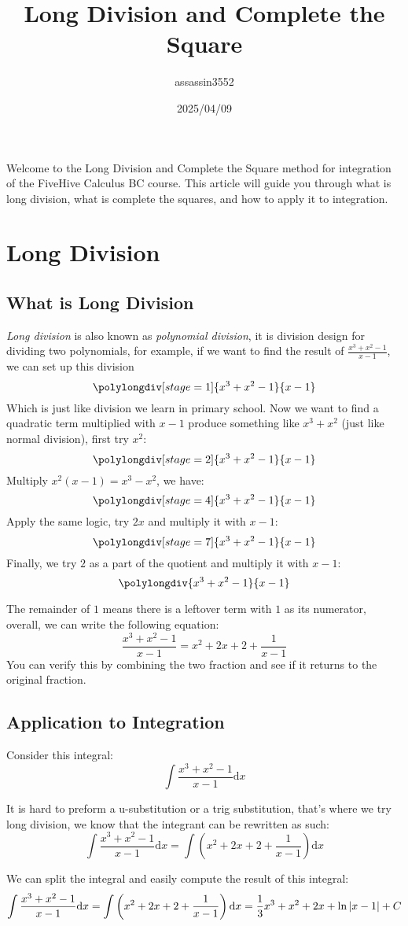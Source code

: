 \documentclass{article}
\title{Long Division and Complete the Square}
\author{assassin3552}
\date{2025/04/09}
\numberwithin{equation}{section}
\begin{document}
\maketitle
Welcome to the Long Division and Complete the Square method for integration of the FiveHive Calculus BC course. This article will guide you through what is long division, what is complete the squares, and how to apply it to integration.
\section{Long Division}
\subsection{What is Long Division}
\emph{Long division} is also known as \emph{polynomial division}, it is division design for dividing two polynomials, for example, 
if we want to find the result of $\displaystyle \frac{x^3+x^2-1}{x-1}$, 
we can set up this division
\[
    \polylongdiv[stage=1]{x^3+x^2-1}{x-1}
\]
Which is just like division we learn in primary school. Now we want to find a quadratic term multiplied with $x-1$ produce something
like $x^3 + x^2$ (just like normal division), first try $x^2$:
\[
    \polylongdiv[stage=2]{x^3+x^2-1}{x-1}
\]
Multiply $x^2(x-1) = x^3 -x^2$, we have:
\[
    \polylongdiv[stage=4]{x^3+x^2-1}{x-1}
\]
Apply the same logic, try $2x$ and multiply it with $x-1$:
\[
    \polylongdiv[stage=7]{x^3+x^2-1}{x-1}
\]
Finally, we try $2$ as a part of the quotient and multiply it with $x-1$:
\[
    \polylongdiv{x^3+x^2-1}{x-1}
\]

The remainder of $1$ means there is a leftover term with $1$ as its numerator,
overall, we can write the following equation:
\[
\frac{x^3+x^2-1}{x-1} = x^2+2x+2 + \frac{1}{x-1}
\]
You can verify this by combining the two fraction and see if it returns 
to the original fraction.

\subsection{Application to Integration}
Consider this integral:
\[
\int \frac{x^3+x^2-1}{x-1} \mathrm{d}x
\]

It is hard to preform a u-substitution or a trig substitution, that's where we try long division, we know that the integrant can be rewritten as such:
\[
\int \frac{x^3+x^2-1}{x-1} \mathrm{d}x = \int \left(x^2+2x+2 + \frac{1}{x-1}\right) \mathrm{d}x
\]

We can split the integral and easily compute the result of this integral:
\[
\int \frac{x^3+x^2-1}{x-1} \mathrm{d}x = \int \left(x^2+2x+2 + \frac{1}{x-1}\right) \mathrm{d}x = \frac{1}{3}x^3 + x^2 + 2x + \ln\abs{x-1} + C
\]
\end{document}
